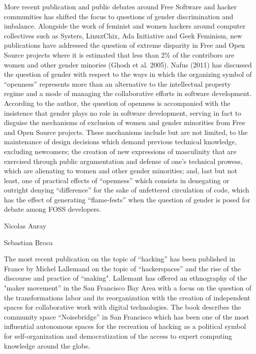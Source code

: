 \documentclass[10pt,letter,oneside]{scrartcl}
\begin{document}
More recent publication and public debates around Free Software and hacker
communities has shifted the focus to questions of gender discrimination and
imbalance.  Alongside the work of feminist and women hackers around computer
collectives such as Systers, LinuxChix, Ada Initiative and Geek Feminism, new
publications have addressed the  question of extreme disparity in Free and Open
Source projects where it is estimated that less than 2\% of the contribors are
women and other gender minories (Ghosh et al.  2005).  Nafus (2011) has
discussed the question of gender with respect to the ways in which the
organizing symbol of ``openness'' represents more than an alternative to the
intellectual property regime and a mode of managing the collaborative efforts
in software development. According to the author, the question of openness is
accompanied with the insistence that gender plays no role in software
development, serving in fact to disguise the mechanisms of exclusion of women
and gender minorities from Free and Open Source projects.  These mechanisms
include but are not limited, to the maintenance of design decisions which
demand previous technical knowledge, excluding newcomers; the creation of new
expressions of masculinity that are exercised through public argumentation and
defense of one's technical prowess, which are alienating to women and other
gender minorities; and, last but not least, one of practical effects of
``openness'' which consists in denegating or outright denying ``difference''
for the sake of unfettered circulation of code, which has the effect of
generating ``flame-fests'' when the question of gender is posed for debate
among FOSS developers. 

Nicolas Auray    %

Sebastian Broca   %

The most recent publication on the topic of ``hacking'' has been published in
France by Michel Lallemand on the topic of ``hackerspaces'' and the rise of the
discourse and practice of ``making".  Lallemant has offered an ethnography of
the "maker movement'' in the San Francisco Bay Area with a focus on the
question of the transformations labor and its reorganization with the creation
of independent spaces for collaborative work with digital technologies. The
book describes the community space ``Noisebridge'' in San Francisco which has
been one of the most influential autonomous spaces for the recreation of
hacking as a political symbol for self-organization and democratization of the
access to expert computing knowledge around the globe.
\end{document}
